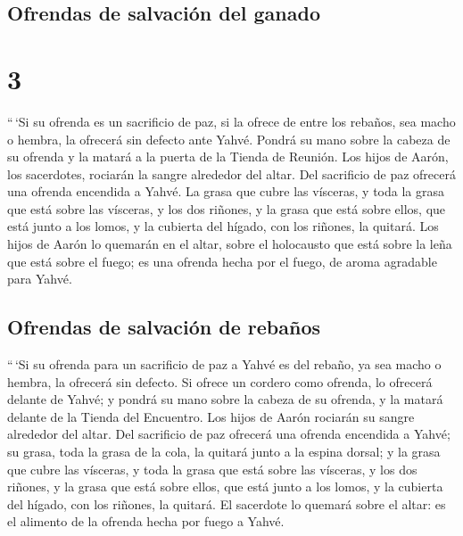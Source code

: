 \hypertarget{ofrendas-de-salvaciuxf3n-del-ganado}{%
\subsection{Ofrendas de salvación del
ganado}\label{ofrendas-de-salvaciuxf3n-del-ganado}}

\hypertarget{section-2}{%
\section{3}\label{section-2}}

 ``\,`Si su ofrenda es un sacrificio de paz, si la ofrece
de entre los rebaños, sea macho o hembra, la ofrecerá sin defecto ante
Yahvé.  Pondrá su mano sobre la cabeza de su ofrenda y la
matará a la puerta de la Tienda de Reunión. Los hijos de Aarón, los
sacerdotes, rociarán la sangre alrededor del altar.  Del
sacrificio de paz ofrecerá una ofrenda encendida a Yahvé. La grasa que
cubre las vísceras, y toda la grasa que está sobre las vísceras,
 y los dos riñones, y la grasa que está sobre ellos, que
está junto a los lomos, y la cubierta del hígado, con los riñones, la
quitará.  Los hijos de Aarón lo quemarán en el altar,
sobre el holocausto que está sobre la leña que está sobre el fuego; es
una ofrenda hecha por el fuego, de aroma agradable para Yahvé.

\hypertarget{ofrendas-de-salvaciuxf3n-de-rebauxf1os}{%
\subsection{Ofrendas de salvación de
rebaños}\label{ofrendas-de-salvaciuxf3n-de-rebauxf1os}}

 ``\,`Si su ofrenda para un sacrificio de paz a Yahvé es
del rebaño, ya sea macho o hembra, la ofrecerá sin defecto.
 Si ofrece un cordero como ofrenda, lo ofrecerá delante de
Yahvé;  y pondrá su mano sobre la cabeza de su ofrenda, y
la matará delante de la Tienda del Encuentro. Los hijos de Aarón
rociarán su sangre alrededor del altar.  Del sacrificio de
paz ofrecerá una ofrenda encendida a Yahvé; su grasa, toda la grasa de
la cola, la quitará junto a la espina dorsal; y la grasa que cubre las
vísceras, y toda la grasa que está sobre las vísceras,  y
los dos riñones, y la grasa que está sobre ellos, que está junto a los
lomos, y la cubierta del hígado, con los riñones, la quitará.
 El sacerdote lo quemará sobre el altar: es el alimento
de la ofrenda hecha por fuego a Yahvé.

